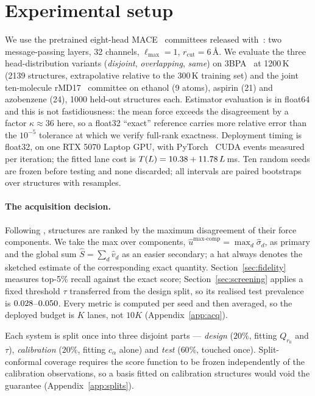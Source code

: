 \documentclass{article}
\begin{document}
\section{Experimental setup}
\label{sec:setup}
We use the pretrained eight-head MACE~\citep{mace} committees released with~\citet{beck2025mhc}: two message-passing
layers, 32 channels, $\ell_{\max}=1$, $r_{\mathrm{cut}}=6$\,\AA. We evaluate the three
head-distribution variants (\emph{disjoint}, \emph{overlapping}, \emph{same}) on 3BPA~\citep{botnet3bpa} at 1200\,K
(2139 structures, extrapolative relative to the 300\,K training set) and the joint ten-molecule
rMD17~\citep{rmd17} committee on ethanol (9 atoms), aspirin (21) and azobenzene (24), 1000 held-out structures each.
Estimator evaluation is in float64 and this is not fastidiousness: the mean force exceeds the
disagreement by a factor $\kappa\approx36$ here, so a float32 ``exact'' reference carries more
relative error than the $10^{-5}$ tolerance at which we verify full-rank exactness. Deployment
timing is float32, on one RTX 5070 Laptop GPU, with PyTorch~\citep{pytorch} CUDA events measured per
iteration; the fitted lane cost is $T(L)=10.38 + 11.78\,L$\,ms. Ten random seeds
are frozen before testing and none discarded; all intervals are paired
bootstraps~\citep{efron} over structures with \fsNBoot{} resamples.

\paragraph{The acquisition decision.}
Following \citet{beck2025mhc}, structures are ranked by the maximum disagreement of their force
components. We take the max over components, $\widehat u^{\max\text{-comp}}=\max_d\widehat\sigma_d$, as
primary and the global sum $\widehat S=\sum_d\widehat v_d$ as an easier secondary; a hat always denotes
the sketched estimate of the corresponding exact quantity. Section~\ref{sec:fidelity} measures
top-5\% recall against the exact score; Section~\ref{sec:screening} applies a fixed threshold $\tau$
transferred from the design split, so its realised test prevalence is
$0.028$--$0.050$. Every metric is computed per seed and then averaged, so
the deployed budget is $K$ lanes, not $10K$ (Appendix~\ref{app:acq}).

Each system is split once into three disjoint parts --- \emph{design} ($20\%$, fitting $Q_{r_0}$ and
$\tau$), \emph{calibration} ($20\%$, fitting $c_\alpha$ alone) and \emph{test} ($60\%$, touched once).
Split-conformal coverage requires the score function to be frozen independently of the calibration
observations, so a basis fitted on calibration structures would void the guarantee
(Appendix~\ref{app:splits}).
\end{document}
